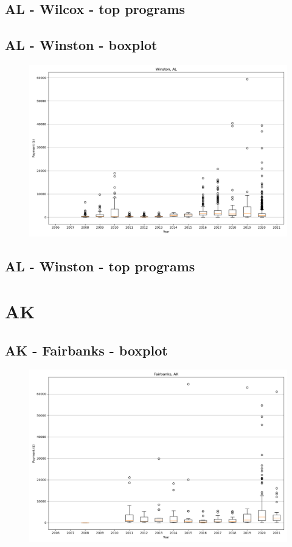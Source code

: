 \subsection*{AL - Wilcox - top programs}

\newpage
\subsection*{AL - Winston - boxplot}
\begin{figure}[h]
\centering
\includegraphics[width=7in]{../output/boxplots/counties/Winston-AL_boxplot.png}
\end{figure}


\subsection*{AL - Winston - top programs}

\newpage
\section*{AK}
\subsection*{AK - Fairbanks - boxplot}
\begin{figure}[h]
\centering
\includegraphics[width=7in]{../output/boxplots/counties/Fairbanks-AK_boxplot.png}
\end{figure}


